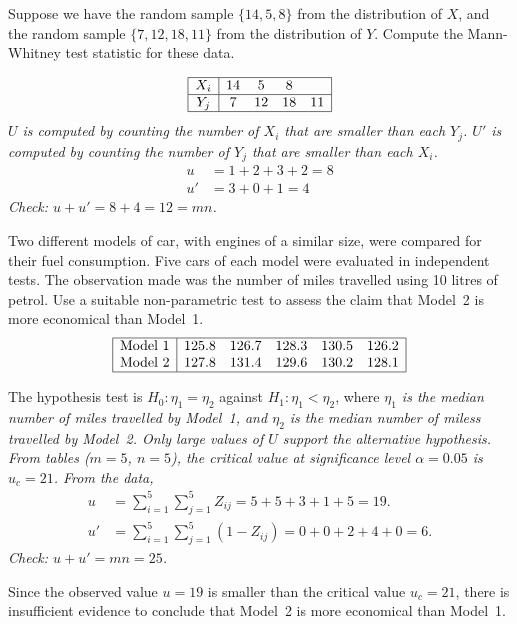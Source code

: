 \begin{example}
Suppose we have the random sample $\{14,5,8\}$ from the distribution of $X$, and the random sample $\{7,12,18,11\}$ from the distribution of $Y$. Compute the Mann-Whitney test statistic for these data.
\end{example}
\begin{solution}
\[\begin{array}{|c|cccc|}\hline
X_i		& 14		&  5		&  8		& \\ \hline
Y_j		&  7		& 12		& 18		& 11 \\ \hline 
\end{array}\]
\bit 
\it $U$ is computed by counting the number of $X_i$ that are smaller than each $Y_j$.
\it $U'$ is computed by counting the number of $Y_j$ that are smaller than each $X_i$.
\eit
\begin{align*}
u 	& = 1 + 2 + 3 + 2 = 8 \\
u'	& = 3 + 0 + 1 = 4
\end{align*}
Check: $u+u' = 8 + 4 = 12 = mn$.
\end{solution}

\begin{example}\label{ex:mannwhitney}
Two different models of car, with engines of a similar size, were compared for their fuel consumption. Five cars of each model were evaluated in independent tests. The observation made was the number of miles travelled using 10 litres of petrol. Use a suitable non-parametric test to assess the claim that Model~2 is more economical than Model~1.
\[\begin{array}{|l|ccccc|}\hline
\text{Model 1}	& 125.8	& 126.7	& 128.3	& 130.5	& 126.2 \\
\text{Model 2}	& 127.8 & 131.4	& 129.6	& 130.2	& 128.1 \\ \hline
\end{array}\]
\end{example}
\begin{solution}
The hypothesis test is $H_0:\eta_1=\eta_2$ against $H_1:\eta_1 < \eta_2$, where
\bit
\it $\eta_1$ is the median number of miles travelled by Model~1, and
\it $\eta_2$ is the median number of miless travelled by Model~2.
\eit
Only large values of $U$ support the alternative hypothesis. 
From tables ($m=5$, $n=5$), the critical value at significance level $\alpha=0.05$ is $u_c=21$. 
From the data,
\begin{align*}
u 		& = \sum_{i=1}^5\sum_{j=1}^5 Z_{ij} = 5 + 5 + 3 + 1 + 5 = 19. \\
u'		& = \sum_{i=1}^5\sum_{j=1}^5 (1-Z_{ij}) = 0 + 0 + 2 + 4 + 0 = 6.
\end{align*}
Check: $u + u' = mn = 25$. 
\par
Since the observed value $u=19$ is smaller than the critical value $u_c=21$, there is insufficient evidence to conclude that Model~2 is more economical than Model~1. 
\end{solution}

